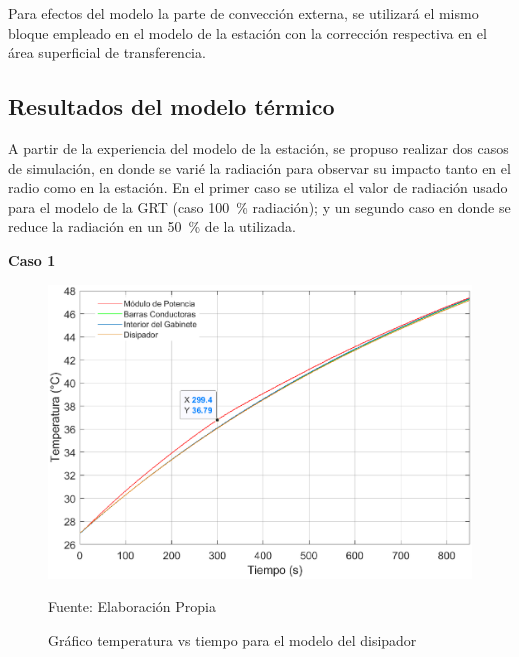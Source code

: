 Para efectos del modelo la parte de convección externa, se utilizará el mismo bloque empleado en el modelo de la estación con la corrección respectiva en el área superficial de transferencia.

\subsection{Resultados del modelo térmico}

A partir de la experiencia del modelo de la estación, se propuso realizar dos casos de simulación, en donde se varié la radiación para observar su impacto tanto en el radio como en la estación. En el primer caso se utiliza el valor de radiación usado para el modelo de la GRT (caso \SI{100}{\percent} radiación); y un segundo caso en donde se reduce la radiación en un \SI{50}{\percent} de la utilizada.

\textbf{Caso 1}

\begin{figure}[H]
\centering
\includegraphics[scale=0.65]{Figuras/disipador_T.eps}
\caption{Gráfico temperatura vs tiempo para el modelo del disipador}
Fuente: Elaboración Propia
\label{disipador T}
\end{figure}

